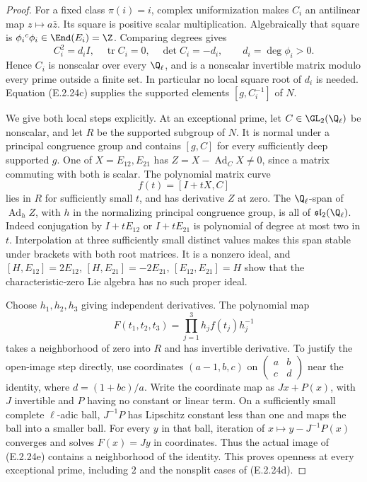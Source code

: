 \begin{proof}
For a fixed class \(\pi(i)=i\), complex uniformization
makes \(C_i\) an antilinear map \(z\mapsto a\bar z\).
Its square is positive scalar multiplication. Algebraically
that square is \(\phi_i{}^c\phi_i\in\End(E_i)=\Z\).
Comparing degrees gives
\[
 C_i^2=d_iI,\quad \operatorname{tr}C_i=0,\quad
 \det C_i=-d_i,\qquad d_i=\deg\phi_i>0.
 \tag{E.2.24d}
\]
Hence \(C_i\) is nonscalar over every \(\Q_\ell\), and
is a nonscalar invertible matrix modulo every prime
outside a finite set. In particular no local square root
of \(d_i\) is needed. Equation (E.2.24c) supplies the
supported elements \([g,C_i^{-1}]\) of \(N\).

We give both local steps explicitly. At an exceptional prime,
let \(C\in\GL_2(\Q_\ell)\) be nonscalar, and let \(R\)
be the supported subgroup of \(N\). It is normal under a
principal congruence group and contains \([g,C]\) for every
sufficiently deep supported \(g\). One of
\(X=E_{12},E_{21}\) has
\(Z=X-\operatorname{Ad}_C X\ne0\), since a matrix
commuting with both is scalar. The polynomial matrix curve
\[
 f(t)=[I+tX,C]
\]
lies in \(R\) for sufficiently small \(t\), and has
derivative \(Z\) at zero. The \(\Q_\ell\)-span of
\(\operatorname{Ad}_hZ\), with \(h\) in the normalizing
principal congruence group, is all of
\(\mathfrak{sl}_2(\Q_\ell)\). Indeed conjugation by
\(I+tE_{12}\) or \(I+tE_{21}\) is polynomial of degree
at most two in \(t\). Interpolation at three sufficiently
small distinct values makes this span stable under brackets
with both root matrices. It is a nonzero ideal, and
\([H,E_{12}]=2E_{12}\), \([H,E_{21}]=-2E_{21}\),
\([E_{12},E_{21}]=H\) show that the characteristic-zero
Lie algebra has no such proper ideal.

Choose \(h_1,h_2,h_3\) giving independent derivatives.
The polynomial map
\[
 F(t_1,t_2,t_3)=\prod_{j=1}^3h_jf(t_j)h_j^{-1}
 \tag{E.2.24e}
\]
takes a neighborhood of zero into \(R\) and has invertible
derivative. To justify the open-image step directly, use
coordinates \((a-1,b,c)\) on
\(\left(\begin{smallmatrix}a&b\\c&d\end{smallmatrix}\right)\)
near the identity, where \(d=(1+bc)/a\).
Write the coordinate map as \(Jx+P(x)\), with \(J\)
invertible and \(P\) having no constant or linear term.
On a sufficiently small complete \(\ell\)-adic ball,
\(J^{-1}P\) has Lipschitz constant less than one and
maps the ball into a smaller ball. For every \(y\) in
that ball, iteration of
\(x\mapsto y-J^{-1}P(x)\) converges and solves
\(F(x)=Jy\) in coordinates. Thus the actual image of
(E.2.24e) contains a neighborhood of the identity.
This proves openness at every exceptional prime, including
\(2\) and the nonsplit cases of (E.2.24d).


\end{proof}
